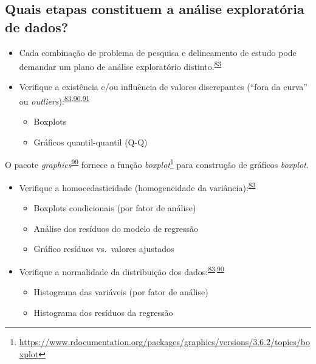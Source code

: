 \documentclass[
  a4paper,
]{book}
\renewcommand{\href}[2]{#2\footnote{\url{#1}}}
\newenvironment{infobox}[1]
  {
  \begin{itemize}
  \renewcommand{\labelitemi}{
    \raisebox{-.7\height}[0pt][0pt]{
      {\setkeys{Gin}{width=3em,keepaspectratio}
        \texttt{[image: \#1]}}
    }
  }
  \setlength{\fboxsep}{1em}
  \begin{blackbox}
  \item
  }
  {
  \end{blackbox}
  \end{itemize}
  }
\begin{document}
\hypertarget{quais-etapas-constituem-a-anuxe1lise-exploratuxf3ria-de-dados}{%
\subsection{Quais etapas constituem a análise exploratória de dados?}\label{quais-etapas-constituem-a-anuxe1lise-exploratuxf3ria-de-dados}}

\begin{itemize}
\item
  Cada combinação de problema de pesquisa e delineamento de estudo pode demandar um plano de análise exploratório distinto.\textsuperscript{\protect\hyperlink{ref-zuur2009}{83}}
\item
  Verifique a existência e/ou influência de valores discrepantes (``fora da curva'' ou \emph{outliers}):\textsuperscript{\protect\hyperlink{ref-zuur2009}{83},\protect\hyperlink{ref-chatfield1986}{90},\protect\hyperlink{ref-Ferketich1986}{91}}

  \begin{itemize}
  \item
    Boxplots
  \item
    Gráficos quantil-quantil (Q-Q)
  \end{itemize}
\end{itemize}

\begin{infobox}{images/Rlogo}
O pacote \emph{graphics}\textsuperscript{\protect\hyperlink{ref-graphics}{99}} fornece a função \href{https://www.rdocumentation.org/packages/graphics/versions/3.6.2/topics/boxplot}{\emph{boxplot}} para construção de gráficos \emph{boxplot}.

\end{infobox}

\begin{itemize}
\item
  Verifique a homocedasticidade (homogeneidade da variância):\textsuperscript{\protect\hyperlink{ref-zuur2009}{83}}

  \begin{itemize}
  \item
    Boxplots condicionais (por fator de análise)
  \item
    Análise dos resíduos do modelo de regressão
  \item
    Gráfico resíduos vs.~valores ajustados
  \end{itemize}
\end{itemize}

\begin{itemize}
\item
  Verifique a normalidade da distribuição dos dados:\textsuperscript{\protect\hyperlink{ref-zuur2009}{83},\protect\hyperlink{ref-chatfield1986}{90}}

  \begin{itemize}
  \item
    Histograma das variáveis (por fator de análise)
  \item
    Histograma dos resíduos da regressão
  \end{itemize}
\end{itemize}
\end{document}
